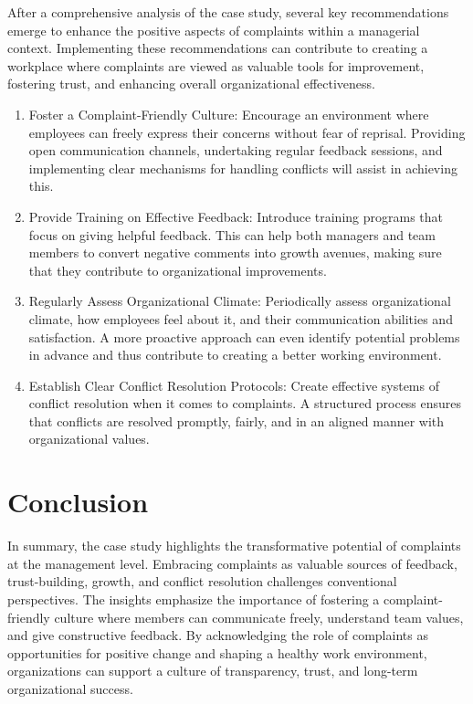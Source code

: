 \documentclass[a4paper,12pt]{report}
\begin{document}
After a comprehensive analysis of the case study, several key recommendations emerge to enhance the positive aspects of complaints within a managerial context. Implementing these recommendations can contribute to creating a workplace where complaints are viewed as valuable tools for improvement, fostering trust, and enhancing overall organizational effectiveness.
\begin{enumerate}
    \item Foster a Complaint-Friendly Culture:
Encourage an environment where employees can freely express their concerns without fear of reprisal. Providing open communication channels, undertaking regular feedback sessions, and implementing clear mechanisms for handling conflicts will assist in achieving this.

    \item Provide Training on Effective Feedback:
Introduce training programs that focus on giving helpful feedback. This can help both managers and team members to convert negative comments into growth avenues, making sure that they contribute to organizational improvements.

    \item Regularly Assess Organizational Climate:
Periodically assess organizational climate, how employees feel about it, and their communication abilities and satisfaction. A more proactive approach can even identify potential problems in advance and thus contribute to creating a better working environment.

    \item Establish Clear Conflict Resolution Protocols:
Create effective systems of conflict resolution when it comes to complaints. A structured process ensures that conflicts are resolved promptly, fairly, and in an aligned manner with organizational values.
\end{enumerate}
\chapter{Conclusion}
In summary, the case study highlights the transformative potential of complaints at the management level. Embracing complaints as valuable sources of feedback, trust-building, growth, and conflict resolution challenges conventional perspectives. The insights emphasize the importance of fostering a complaint-friendly culture where members can communicate freely, understand team values, and give constructive feedback. By acknowledging the role of complaints as opportunities for positive change and shaping a healthy work environment, organizations can support a culture of transparency, trust, and long-term organizational success.
\end{document}

